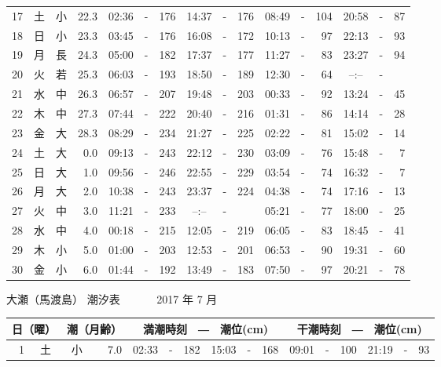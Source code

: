 \documentclass[12pt.a4j]{jsarticle}
\begin{document}
\begin{center}
\begin{table}[ht]
\begin{tabular}{|rc|cr|ccrccr|ccrccr|}
17 & 土 & 小 & 22.3 &  02:36 &-& 176  &  14:37 &-& 176  &   08:49 &-& 104  &   20:58 &-&  87  \\
18 & 日 & 小 & 23.3 &  03:45 &-& 176  &  16:08 &-& 172  &   10:13 &-&  97  &   22:13 &-&  93  \\
19 & 月 & 長 & 24.3 &  05:00 &-& 182  &  17:37 &-& 177  &   11:27 &-&  83  &   23:27 &-&  94  \\
20 & 火 & 若 & 25.3 &  06:03 &-& 193  &  18:50 &-& 189  &   12:30 &-&  64  &   --:-- &-&     \\
21 & 水 & 中 & 26.3 &  06:57 &-& 207  &  19:48 &-& 203  &   00:33 &-&  92  &   13:24 &-&  45  \\
22 & 木 & 中 & 27.3 &  07:44 &-& 222  &  20:40 &-& 216  &   01:31 &-&  86  &   14:14 &-&  28  \\
23 & 金 & 大 & 28.3 &  08:29 &-& 234  &  21:27 &-& 225  &   02:22 &-&  81  &   15:02 &-&  14  \\
24 & 土 & 大 &  0.0 &  09:13 &-& 243  &  22:12 &-& 230  &   03:09 &-&  76  &   15:48 &-&   7  \\
25 & 日 & 大 &  1.0 &  09:56 &-& 246  &  22:55 &-& 229  &   03:54 &-&  74  &   16:32 &-&   7  \\
26 & 月 & 大 &  2.0 &  10:38 &-& 243  &  23:37 &-& 224  &   04:38 &-&  74  &   17:16 &-&  13  \\
27 & 火 & 中 &  3.0 &  11:21 &-& 233  &  --:-- &-&     &   05:21 &-&  77  &   18:00 &-&  25  \\
28 & 水 & 中 &  4.0 &  00:18 &-& 215  &  12:05 &-& 219  &   06:05 &-&  83  &   18:45 &-&  41  \\
29 & 木 & 小 &  5.0 &  01:00 &-& 203  &  12:53 &-& 201  &   06:53 &-&  90  &   19:31 &-&  60  \\
30 & 金 & 小 &  6.0 &  01:44 &-& 192  &  13:49 &-& 183  &   07:50 &-&  97  &   20:21 &-&  78  \\
   \hline
   \end{tabular}
\end{table}
\newpage
 {\LARGE 大瀬（馬渡島）  潮汐表　　　}
 {\large 2017 年  7 月}\\
 \begin{table}[ht]
    \begin{tabular}{|rc|cr|ccrccr|ccrccr|}
    \hline
    \multicolumn{2}{|c|}{日（曜）} & \multicolumn{2}{c|}{潮（月齢）} & \multicolumn{6}{c|}{満潮時刻　―　潮位(cm)} & \multicolumn{6}{c|}{干潮時刻　―　潮位(cm)} \\
 \hline
 1 & 土 & 小 &  7.0 &  02:33 &-& 182  &  15:03 &-& 168  &   09:01 &-& 100  &   21:19 &-&  93  \\

\end{tabular}
\end{table}
\end{center}
\end{document}
